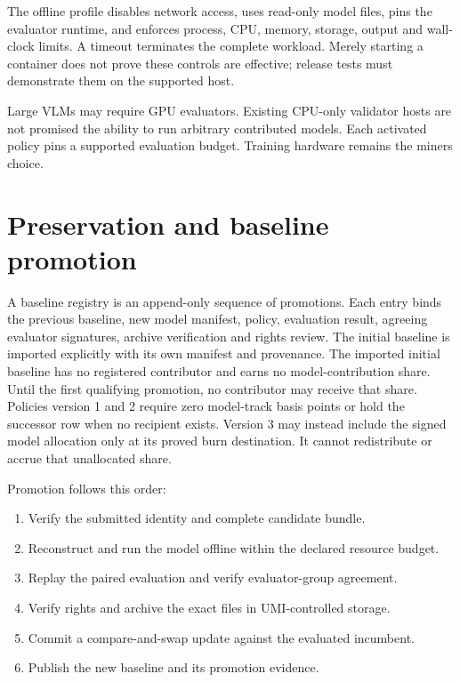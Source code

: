 The offline profile disables network access, uses read-only model files,
pins the evaluator runtime, and enforces process, CPU, memory, storage,
output and wall-clock limits. A timeout terminates the complete workload.
Merely starting a container does not prove these controls are effective;
release tests must demonstrate them on the supported host.

Large VLMs may require GPU evaluators. Existing CPU-only validator hosts are
not promised the ability to run arbitrary contributed models. Each activated
policy pins a supported evaluation budget. Training hardware remains the
miner\textquotesingle s choice.

\section{Preservation and baseline promotion}\label{5-preservation-and-baseline-promotion}

A baseline registry is an append-only sequence of promotions. Each entry binds
the previous baseline, new model manifest, policy, evaluation result, agreeing
evaluator signatures, archive verification and rights review. The initial
baseline is imported explicitly with its own manifest and provenance.
The imported initial baseline has no registered contributor and earns no
model-contribution share. Until the first qualifying promotion, no contributor
may receive that share. Policies version 1 and 2 require zero model-track basis
points or hold the successor row when no recipient exists. Version 3 may instead
include the signed model allocation only at its proved burn destination. It
cannot redistribute or accrue that unallocated share.

Promotion follows this order:

\begin{enumerate}
\def\labelenumi{\arabic{enumi}.}
\tightlist
\item
  Verify the submitted identity and complete candidate bundle.
\item
  Reconstruct and run the model offline within the declared resource budget.
\item
  Replay the paired evaluation and verify evaluator-group agreement.
\item
  Verify rights and archive the exact files in UMI-controlled storage.
\item
  Commit a compare-and-swap update against the evaluated incumbent.
\item
  Publish the new baseline and its promotion evidence.
\end{enumerate}

